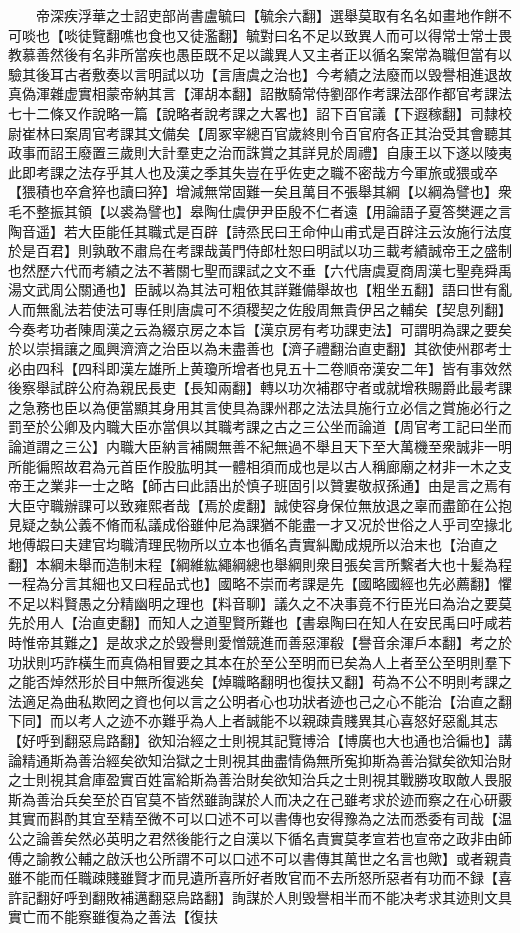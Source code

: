 　　帝深疾浮華之士詔吏部尚書盧毓曰【毓余六翻】選舉莫取有名名如畫地作餅不可啖也【啖徒覽翻噍也食也又徒濫翻】毓對曰名不足以致異人而可以得常士常士畏教慕善然後有名非所當疾也愚臣既不足以識異人又主者正以循名案常為職但當有以驗其後耳古者敷奏以言明試以功【言唐虞之治也】今考績之法廢而以毁譽相進退故真偽渾雜虚實相蒙帝納其言【渾胡本翻】詔散騎常侍劉邵作考課法邵作都官考課法七十二條又作說略一篇【說略者說考課之大畧也】詔下百官議【下遐稼翻】司隸校尉崔林曰案周官考課其文備矣【周冢宰總百官歲終則令百官府各正其治受其會聽其政事而詔王廢置三歲則大計羣吏之治而誅賞之其詳見於周禮】自康王以下遂以陵夷此即考課之法存乎其人也及漢之季其失豈在乎佐吏之職不密哉方今軍旅或猥或卒【猥積也卒倉猝也讀曰猝】增減無常固難一矣且萬目不張舉其綱【以綱為譬也】衆毛不整振其領【以裘為譬也】皋陶仕虞伊尹臣殷不仁者遠【用論語子夏答樊遲之言陶音遥】若大臣能任其職式是百辟【詩烝民曰王命仲山甫式是百辟注云汝施行法度於是百君】則孰敢不肅烏在考課哉黃門侍郎杜恕曰明試以功三載考績誠帝王之盛制也然歷六代而考績之法不著關七聖而課試之文不垂【六代唐虞夏商周漢七聖堯舜禹湯文武周公關通也】臣誠以為其法可粗依其詳難備舉故也【粗坐五翻】語曰世有亂人而無亂法若使法可專任則唐虞可不須稷契之佐殷周無貴伊呂之輔矣【契息列翻】今奏考功者陳周漢之云為綴京房之本旨【漢京房有考功課吏法】可謂明為課之要矣於以崇揖讓之風興濟濟之治臣以為未盡善也【濟子禮翻治直吏翻】其欲使州郡考士必由四科【四科即漢左雄所上黄瓊所增者也見五十二卷順帝漢安二年】皆有事效然後察舉試辟公府為親民長吏【長知兩翻】轉以功次補郡守者或就增秩賜爵此最考課之急務也臣以為便當顯其身用其言使具為課州郡之法法具施行立必信之賞施必行之罰至於公卿及内職大臣亦當俱以其職考課之古之三公坐而論道【周官考工記曰坐而論道謂之三公】内職大臣納言補闕無善不紀無過不舉且天下至大萬機至衆誠非一明所能徧照故君為元首臣作股肱明其一體相須而成也是以古人稱廊廟之材非一木之支帝王之業非一士之略【師古曰此語出於慎子班固引以贊婁敬叔孫通】由是言之焉有大臣守職辦課可以致雍熙者哉【焉於䖍翻】誠使容身保位無放退之辜而盡節在公抱見疑之埶公義不脩而私議成俗雖仲尼為課猶不能盡一才又况於世俗之人乎司空掾北地傅嘏曰夫建官均職清理民物所以立本也循名責實糾勵成規所以治末也【治直之翻】本綱未舉而造制末程【綱維紘繩綱總也舉綱則衆目張矣言所繫者大也十髪為程一程為分言其細也又曰程品式也】國略不崇而考課是先【國略國經也先必薦翻】懼不足以料賢愚之分精幽明之理也【料音聊】議久之不决事竟不行臣光曰為治之要莫先於用人【治直吏翻】而知人之道聖賢所難也【書皋陶曰在知人在安民禹曰吁咸若時惟帝其難之】是故求之於毁譽則愛憎競進而善惡渾殽【譽音余渾戶本翻】考之於功狀則巧詐橫生而真偽相冒要之其本在於至公至明而已矣為人上者至公至明則羣下之能否焯然形於目中無所復逃矣【焯職略翻明也復扶又翻】苟為不公不明則考課之法適足為曲私欺罔之資也何以言之公明者心也功狀者迹也己之心不能治【治直之翻下同】而以考人之迹不亦難乎為人上者誠能不以親疎貴賤異其心喜怒好惡亂其志【好呼到翻惡烏路翻】欲知治經之士則視其記覽博洽【博廣也大也通也洽徧也】講論精通斯為善治經矣欲知治獄之士則視其曲盡情偽無所寃抑斯為善治獄矣欲知治財之士則視其倉庫盈實百姓富給斯為善治財矣欲知治兵之士則視其戰勝攻取敵人畏服斯為善治兵矣至於百官莫不皆然雖詢謀於人而决之在己雖考求於迹而察之在心研覈其實而斟酌其宜至精至微不可以口述不可以書傳也安得豫為之法而悉委有司哉【温公之論善矣然必英明之君然後能行之自漢以下循名責實莫孝宣若也宣帝之政非由師傅之諭教公輔之啟沃也公所謂不可以口述不可以書傳其萬世之名言也歟】或者親貴雖不能而任職疎賤雖賢才而見遺所喜所好者敗官而不去所怒所惡者有功而不録【喜許記翻好呼到翻敗補邁翻惡烏路翻】詢謀於人則毁譽相半而不能决考求其迹則文具實亡而不能察雖復為之善法【復扶
